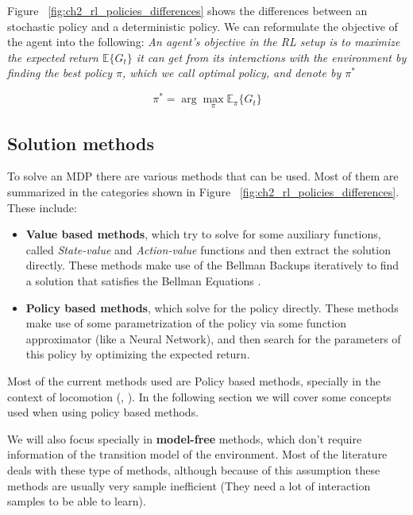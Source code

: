 \figRlPolicies

Figure ~\ref{fig:ch2_rl_policies_differences} shows the differences between an stochastic policy and a deterministic
policy. We can reformulate the objective of the agent into the following: \textit{An agent's objective
in the RL setup is to maximize the expected return $\mathbb{E} \lbrace G_{t} \rbrace$ it
can get from its interactions with the environment by finding the best policy $\pi$, which
we call optimal policy, and denote by $\pi^{*}$}

\begin{equation} \label{eq:rl_objective}
    \pi^{*} = \arg \max_{\pi} \mathbb{E}_{\pi} \lbrace G_{t} \rbrace
\end{equation}

\subsection{Solution methods}

\figRlMethodsLandspace

To solve an MDP there are various methods that can be used. Most of them are
summarized in the categories shown in Figure ~\ref{fig:ch2_rl_policies_differences}. These include:

\begin{itemize}
    \item \textbf{Value based methods}, which try to solve for some auxiliary
          functions, called \textit{State-value} and \textit{Action-value} functions
          and then extract the solution directly. These methods make use of the Bellman
          Backups iteratively to find a solution that satisfies the Bellman Equations \citep{Bellman}.
    \item \textbf{Policy based methods}, which solve for the policy directly. These methods
          make use of some parametrization of the policy via some function approximator
          (like a Neural Network), and then search for the parameters of this policy
          by optimizing the expected return.
\end{itemize}

Most of the current methods used are Policy based methods, specially in the context
of locomotion (\citet{TRPO}, \citet{PPO}). In the following section we 
will cover some concepts used when using policy based methods.

We will also focus specially in \textbf{model-free} methods,
which don't require information of the transition model of the environment. Most of the
literature deals with these type of methods, although because of this assumption these
methods are usually very sample inefficient (They need a lot of interaction samples to be
able to learn).

